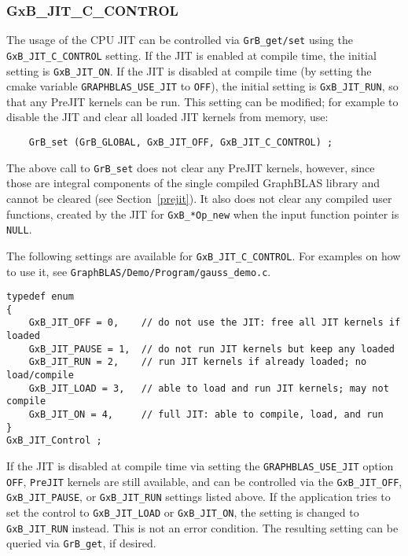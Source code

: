 \documentclass[12pt]{article}
\begin{document}
\subsubsection{\sf GxB\_JIT\_C\_CONTROL}

The usage of the CPU JIT can be controlled via \verb'GrB_get/set' using the
\verb'GxB_JIT_C_CONTROL' setting.  If the JIT is enabled at compile time, the
initial setting is \verb'GxB_JIT_ON'.  If the JIT is disabled at compile time
(by setting the cmake variable \verb'GRAPHBLAS_USE_JIT' to \verb'OFF'), the
initial setting is \verb'GxB_JIT_RUN', so that any PreJIT kernels can be run.
This setting can be modified; for example to disable the JIT and clear all
loaded JIT kernels from memory, use:

\begin{verbatim}
    GrB_set (GrB_GLOBAL, GxB_JIT_OFF, GxB_JIT_C_CONTROL) ;
\end{verbatim}

The above call to \verb'GrB_set' does not clear any PreJIT kernels, however,
since those are integral components of the single compiled GraphBLAS library
and cannot be cleared (see Section~\ref{prejit}).  It also does not clear any
compiled user functions, created by the JIT for \verb'GxB_*Op_new' when the
input function pointer is \verb'NULL'.

The following settings are available for \verb'GxB_JIT_C_CONTROL'.
For examples on how to use it, see
\verb'GraphBLAS/Demo/Program/gauss_demo.c'.

{\footnotesize
\begin{verbatim}
typedef enum
{
    GxB_JIT_OFF = 0,    // do not use the JIT: free all JIT kernels if loaded
    GxB_JIT_PAUSE = 1,  // do not run JIT kernels but keep any loaded
    GxB_JIT_RUN = 2,    // run JIT kernels if already loaded; no load/compile
    GxB_JIT_LOAD = 3,   // able to load and run JIT kernels; may not compile
    GxB_JIT_ON = 4,     // full JIT: able to compile, load, and run
}
GxB_JIT_Control ;
\end{verbatim} }

If the JIT is disabled at compile time via setting the \verb'GRAPHBLAS_USE_JIT'
option \verb'OFF', \verb'PreJIT' kernels are still available, and can be
controlled via the \verb'GxB_JIT_OFF', \verb'GxB_JIT_PAUSE', or
\verb'GxB_JIT_RUN' settings listed above.  If the application tries to set the
control to \verb'GxB_JIT_LOAD' or \verb'GxB_JIT_ON', the setting is changed to
\verb'GxB_JIT_RUN' instead.  This is not an error condition.  The resulting
setting can be queried via \verb'GrB_get', if desired.
\end{document}
